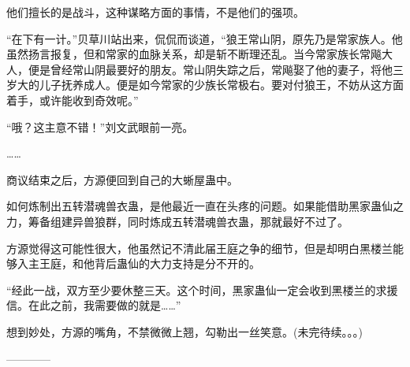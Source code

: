 \begin{this_body}
他们擅长的是战斗，这种谋略方面的事情，不是他们的强项。

“在下有一计。”贝草川站出来，侃侃而谈道，“狼王常山阴，原先乃是常家族人。他虽然扬言报复，但和常家的血脉关系，却是斩不断理还乱。当今常家族长常飚大人，便是曾经常山阴最要好的朋友。常山阴失踪之后，常飚娶了他的妻子，将他三岁大的儿子抚养成人。便是如今常家的少族长常极右。要对付狼王，不妨从这方面着手，或许能收到奇效呢。”

“哦？这主意不错！”刘文武眼前一亮。

……

商议结束之后，方源便回到自己的大蜥屋蛊中。

如何炼制出五转潜魂兽衣蛊，是他最近一直在头疼的问题。如果能借助黑家蛊仙之力，筹备组建异兽狼群，同时炼成五转潜魂兽衣蛊，那就最好不过了。

方源觉得这可能性很大，他虽然记不清此届王庭之争的细节，但是却明白黑楼兰能够入主王庭，和他背后蛊仙的大力支持是分不开的。

“经此一战，双方至少要休整三天。这个时间，黑家蛊仙一定会收到黑楼兰的求援信。在此之前，我需要做的就是……”

想到妙处，方源的嘴角，不禁微微上翘，勾勒出一丝笑意。(未完待续。。。)

------------

\end{this_body}

